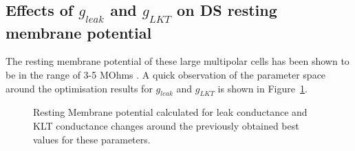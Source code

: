 


\subsection{Effects of $g_{leak}$ and $g_{LKT}$ on DS resting membrane
  potential}

The resting membrane potential of these large multipolar cells has been shown to
be in the range of 3-5 MOhms . A quick
observation of the parameter space around the optimisation results for
$g_{leak}$ and $g_{LKT}$ is shown in Figure~\ref{fig:leakVltk}.
\begin{figure}[h!]
  \centering {}
  \caption{Resting Membrane potential calculated for leak conductance and KLT
    conductance changes around the previously obtained best values for these
    parameters.}\label{fig:leakVltk}
\end{figure}



